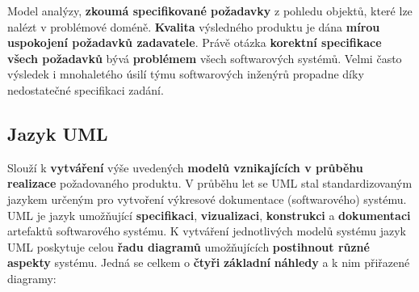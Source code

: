  Model analýzy, \textbf{zkoumá specifikované požadavky} z pohledu objektů, které lze nalézt v problémové doméně. \textbf{Kvalita} výsledného produktu je dána \textbf{mírou uspokojení požadavků zadavatele}. Právě otázka \textbf{korektní specifikace všech požadavků} bývá \textbf{problémem} všech softwarových systémů. Velmi často výsledek i mnohaletého úsilí týmu softwarových inženýrů propadne díky nedostatečné specifikaci zadání.

\subsection{Jazyk UML}
Slouží k \textbf{vytváření} výše uvedených \textbf{modelů vznikajících v průběhu realizace} požadovaného produktu.  V průběhu let se UML stal standardizovaným jazykem určeným pro vytvoření výkresové dokumentace (softwarového) systému. UML je jazyk umožňující \textbf{specifikaci}, \textbf{vizualizaci}, \textbf{konstrukci} a \textbf{dokumentaci} artefaktů softwarového systému. K vytváření jednotlivých modelů systému jazyk UML poskytuje celou \textbf{řadu diagramů} umožňujících \textbf{postihnout různé aspekty} systému. Jedná se celkem o \textbf{čtyři} \textbf{základní} \textbf{náhledy} a k nim přiřazené diagramy:

